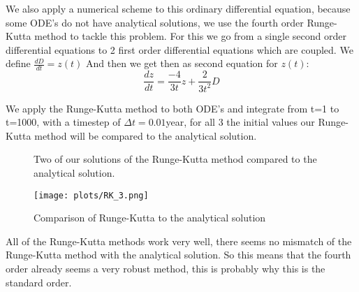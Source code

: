 We also apply a numerical scheme to this ordinary differential equation, because some ODE's do not have analytical solutions, we use the fourth order Runge-Kutta method to tackle this problem. For this we go from a single second order differential equations to 2 first order differential equations which are coupled. We define $\frac{dD}{dt}=z(t)$
And then we get then as second equation for $z(t)$:
\begin{equation}
\frac{dz}{dt}=\frac{-4}{3t}z+\frac{2}{3t^2}D
\end{equation}

We apply the Runge-Kutta method to both ODE's and integrate from t=1 to t=1000, with a timestep of $\Delta t=0.01$year, for all 3 the initial values our Runge-Kutta method will be compared to the analytical solution.

%


%


\begin{figure}
    \centering
    \qquad
    \caption{Two of our solutions of the Runge-Kutta method compared to the analytical solution.}
    \label{fig:rk}
\end{figure}

\begin{figure}[h]
   \centering
   \texttt{[image: plots/RK\_3.png]}
      \caption{Comparison of Runge-Kutta to the analytical solution}
\end{figure}


All of the Runge-Kutta methods work very well, there seems no mismatch of the Runge-Kutta method with the analytical solution. So this means that the fourth order already seems a very robust method, this is probably why this is the standard order.

